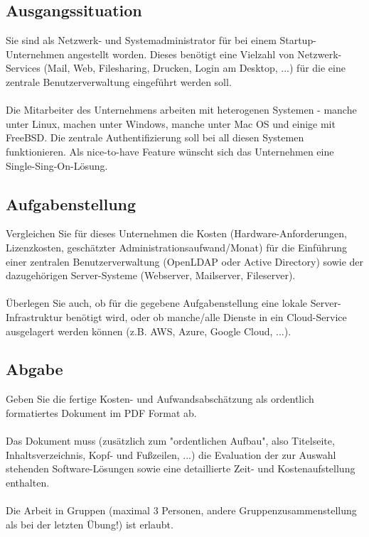 \documentclass[main.tex]{subfiles}
\begin{document}
\subsection{Ausgangssituation}
Sie sind als Netzwerk- und Systemadministrator für bei einem Startup-Unternehmen angestellt worden. Dieses benötigt eine Vielzahl von Netzwerk-Services (Mail, Web, Filesharing, Drucken, Login am Desktop, ...) für die eine zentrale Benutzerverwaltung eingeführt werden soll.\\\\
Die Mitarbeiter des Unternehmens arbeiten mit heterogenen Systemen - manche unter Linux, machen unter Windows, manche unter Mac OS und einige mit FreeBSD. Die zentrale Authentifizierung soll bei all diesen Systemen funktionieren. Als nice-to-have Feature wünscht sich das Unternehmen eine Single-Sing-On-Lösung.

\subsection{Aufgabenstellung}
Vergleichen Sie für dieses Unternehmen die Kosten (Hardware-Anforderungen, Lizenzkosten, geschätzter Administrationsaufwand/Monat) für die Einführung einer zentralen Benutzerverwaltung (OpenLDAP oder Active Directory) sowie der dazugehörigen Server-Systeme (Webserver, Mailserver, Fileserver).\\\\
Überlegen Sie auch, ob für die gegebene Aufgabenstellung eine lokale Server-Infrastruktur benötigt wird, oder ob manche/alle Dienste in ein Cloud-Service ausgelagert werden können (z.B. AWS, Azure, Google Cloud, ...).

\subsection{Abgabe}
Geben Sie die fertige Kosten- und Aufwandsabschätzung als ordentlich formatiertes Dokument im PDF Format ab.
\\\\
Das Dokument muss (zusätzlich zum "ordentlichen Aufbau", also Titelseite, Inhaltsverzeichnis, Kopf- und Fußzeilen, ...) die Evaluation der zur Auswahl stehenden Software-Lösungen sowie eine detaillierte Zeit- und Kostenaufstellung enthalten.
\\\\
Die Arbeit in Gruppen (maximal 3 Personen, andere Gruppenzusammenstellung als bei der letzten Übung!) ist erlaubt.
\end{document}
